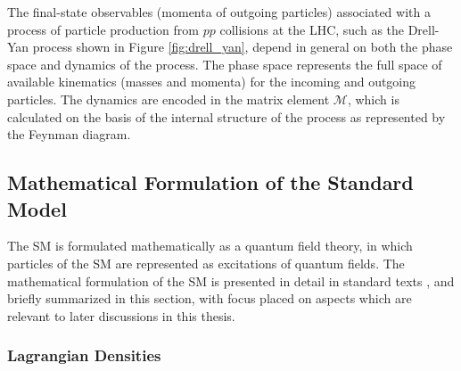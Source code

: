 The final-state observables (momenta of outgoing particles) associated with a process of particle production from \(pp\) collisions at the LHC, such as the Drell-Yan process shown in Figure \ref{fig:drell_yan}, depend in general on both the phase space and dynamics of the process. The phase space represents the full space of available kinematics (masses and momenta) for the incoming and outgoing particles. The dynamics are encoded in the matrix element \(\mathcal{M}\), which is calculated on the basis of the internal structure of the process as represented by the Feynman diagram. 

%
%
%
%
%

\subsection{Mathematical Formulation of the Standard Model}

The SM is formulated mathematically as a quantum field theory, in which particles of the SM are represented as excitations of quantum fields. The mathematical formulation of the SM is presented in detail in standard texts \cite{griffiths_2008, SM_intro}, and briefly summarized in this section, with focus placed on aspects which are relevant to later discussions in this thesis.

\subsubsection{Lagrangian Densities}


